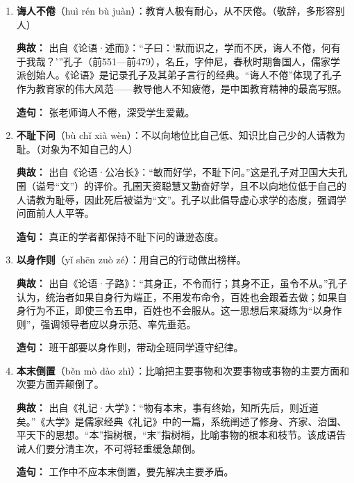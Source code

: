 \begin{enumerate}[leftmargin=*]
    \textbf{造句：} 会议已经开始半小时了，他才姗姗来迟。

    \item \textbf{诲人不倦}（huì rén bù juàn）：教育人极有耐心，从不厌倦。（敬辞，多形容别人）
    
    \textbf{典故：} 出自《论语·述而》：“子曰：‘默而识之，学而不厌，诲人不倦，何有于我哉？’”孔子（前551—前479），名丘，字仲尼，春秋时期鲁国人，儒家学派创始人。《论语》是记录孔子及其弟子言行的经典。“诲人不倦”体现了孔子作为教育家的伟大风范——教导他人不知疲倦，是中国教育精神的最高写照。
    
    \textbf{造句：} 张老师诲人不倦，深受学生爱戴。

    \item \textbf{不耻下问}（bù chǐ xià wèn）：不以向地位比自己低、知识比自己少的人请教为耻。（对象为不知自己的人）
    
    \textbf{典故：} 出自《论语·公冶长》：“敏而好学，不耻下问。”这是孔子对卫国大夫孔圉（谥号“文”）的评价。孔圉天资聪慧又勤奋好学，且不以向地位低于自己的人请教为耻辱，因此死后被谥为“文”。孔子以此倡导虚心求学的态度，强调学问面前人人平等。
    
    \textbf{造句：} 真正的学者都保持不耻下问的谦逊态度。

    \item \textbf{以身作则}（yǐ shēn zuò zé）：用自己的行动做出榜样。
    
    \textbf{典故：} 出自《论语·子路》：“其身正，不令而行；其身不正，虽令不从。”孔子认为，统治者如果自身行为端正，不用发布命令，百姓也会跟着去做；如果自身行为不正，即使三令五申，百姓也不会服从。这一思想后来凝练为“以身作则”，强调领导者应以身示范、率先垂范。
    
    \textbf{造句：} 班干部要以身作则，带动全班同学遵守纪律。

    \item \textbf{本末倒置}（běn mò dào zhì）：比喻把主要事物和次要事物或事物的主要方面和次要方面弄颠倒了。
    
    \textbf{典故：} 出自《礼记·大学》：“物有本末，事有终始，知所先后，则近道矣。”《大学》是儒家经典《礼记》中的一篇，系统阐述了修身、齐家、治国、平天下的思想。“本”指树根，“末”指树梢，比喻事物的根本和枝节。该成语告诫人们要分清主次，不可将轻重缓急颠倒。
    
    \textbf{造句：} 工作中不应本末倒置，要先解决主要矛盾。

\end{enumerate}